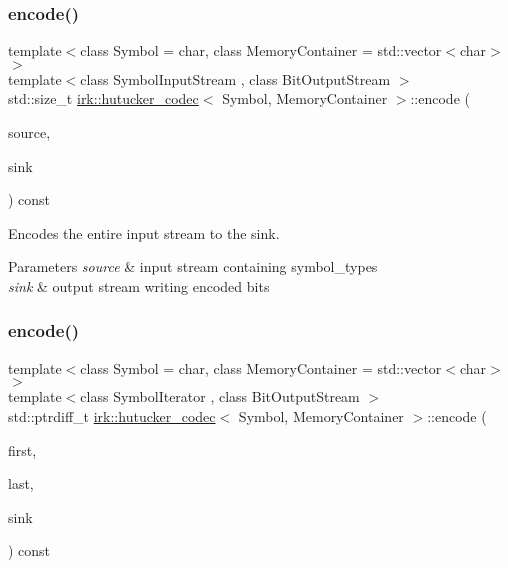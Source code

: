 \subsubsection{\texorpdfstring{encode()}{encode()}\hspace{0.1cm}{\footnotesize\ttfamily [3/5]}}
{\footnotesize\ttfamily template$<$class Symbol = char, class Memory\+Container = std\+::vector$<$char$>$$>$ \\
template$<$class Symbol\+Input\+Stream , class Bit\+Output\+Stream $>$ \\
std\+::size\+\_\+t \mbox{\hyperlink{classirk_1_1hutucker__codec}{irk\+::hutucker\+\_\+codec}}$<$ Symbol, Memory\+Container $>$\+::encode (\begin{DoxyParamCaption}\item[{Symbol\+Input\+Stream \&}]{source,  }\item[{Bit\+Output\+Stream \&}]{sink }\end{DoxyParamCaption}) const\hspace{0.3cm}{\ttfamily [inline]}}



Encodes the entire input stream to the sink. 


\begin{DoxyParams}{Parameters}
{\em source} & input stream containing {\ttfamily symbol\+\_\+type}s \\
\hline
{\em sink} & output stream writing encoded bits \\
\hline
\end{DoxyParams}
\mbox{\label{classirk_1_1hutucker__codec_aea36ea147fe323bcdcf4c82686c75abd}} 
\subsubsection{\texorpdfstring{encode()}{encode()}\hspace{0.1cm}{\footnotesize\ttfamily [4/5]}}
{\footnotesize\ttfamily template$<$class Symbol = char, class Memory\+Container = std\+::vector$<$char$>$$>$ \\
template$<$class Symbol\+Iterator , class Bit\+Output\+Stream $>$ \\
std\+::ptrdiff\+\_\+t \mbox{\hyperlink{classirk_1_1hutucker__codec}{irk\+::hutucker\+\_\+codec}}$<$ Symbol, Memory\+Container $>$\+::encode (\begin{DoxyParamCaption}\item[{Symbol\+Iterator}]{first,  }\item[{Symbol\+Iterator}]{last,  }\item[{Bit\+Output\+Stream \&}]{sink }\end{DoxyParamCaption}) const\hspace{0.3cm}{\ttfamily [inline]}}


